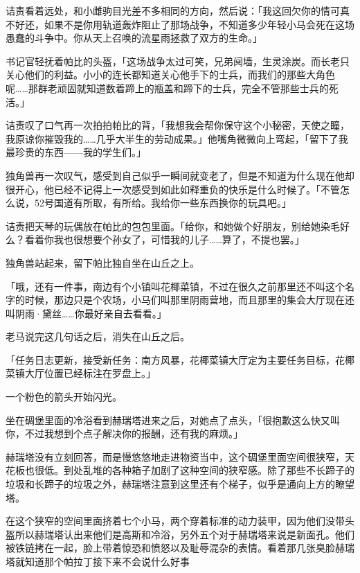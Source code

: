 诘责看着远处，和小雌驹目光差不多相同的方向，然后说：「我这回欠你的情可真不好还，如果不是你用轨道轰炸阻止了那场战争，不知道多少年轻小马会死在这场愚蠢的斗争中。你从天上召唤的流星雨拯救了双方的生命。」

书记官轻抚着帕比的头盔，「这场战争太过可笑，兄弟阋墙，生灵涂炭。而长老只关心他们的利益。小小的连长都知道关心他手下的士兵，而我们的那些大角色呢……那群老顽固就知道数着蹄上的瓶盖和蹄下的士兵，完全不管那些士兵的死活。」

诘责叹了口气再一次拍拍帕比的背，「我想我会帮你保守这个小秘密，天使之瞳，我原谅你摧毁我的……几乎大半生的劳动成果。」他嘴角微微向上弯起，「留下了我最珍贵的东西——我的学生们。」

独角兽再一次叹气，感受到自己似乎一瞬间就变老了，但是不知道为什么现在他却很开心，他已经不记得上一次感受到如此如释重负的快乐是什么时候了。「不管怎么说，52号国道有所取，有所给。我给你一些东西换你的玩具吧。」

诘责把天琴的玩偶放在帕比的包包里面。「给你，和她做个好朋友，别给她染毛好么？看着你我也很想要个孙女了，可惜我的儿子……算了，不提也罢。」

独角兽站起来，留下帕比独自坐在山丘之上。

「哦，还有一件事，南边有个小镇叫花椰菜镇，不过在很久之前那里还不叫这个名字的时候，那边只是个农场，小马们叫那里阴雨营地，而且那里的集会大厅现在还叫阴雨·黛丝……你最好亲自去看看。」

老马说完这几句话之后，消失在山丘之后。

「{\rt 任务日志更新，接受新任务：南方风暴，花椰菜镇大厅定为主要任务目标，花椰菜镇大厅位置已经标注在罗盘上。}」

一个粉色的箭头开始闪光。

\horizonline


坐在碉堡里面的冷浴看到赫瑞塔进来之后，对她点了点头，「很抱歉这么快又叫你，不过我想到个点子解决你的报酬，还有我的麻烦。」

赫瑞塔没有立刻回答，而是慢悠悠地走进物资当中，这个碉堡里面空间很狭窄，天花板也很低。到处乱堆的各种箱子加剧了这种空间的狭窄感。除了那些不长蹄子的垃圾和长蹄子的垃圾之外，赫瑞塔注意到这里还有个梯子，似乎是通向上方的瞭望塔。

在这个狭窄的空间里面挤着七个小马，两个穿着标准的动力装甲，因为他们没带头盔所以赫瑞塔认出来他们是高斯和冷浴，另外五个对于赫瑞塔来说是新面孔。他们被铁链拷在一起，脸上带着惊恐和愤怒以及耻辱混杂的表情。看着那几张臭脸赫瑞塔就知道那个帕拉丁接下来不会说什么好事

